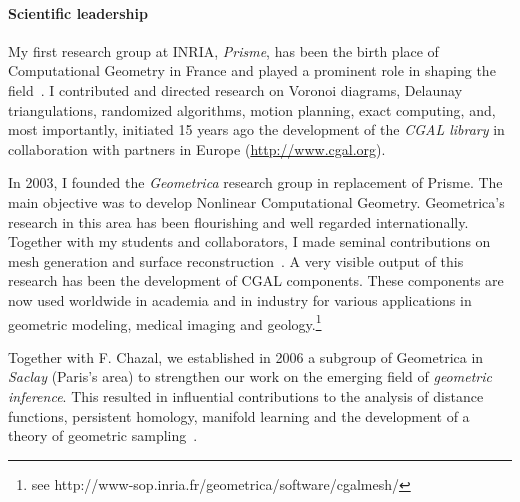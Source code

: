 
\paragraph{Scientific leadership} \mbox{}


My first research group at INRIA, {\em Prisme}, has been the birth place of Computational Geometry in France and played a prominent role in shaping the field~\cite{by-ag-98}. 
I contributed and directed research on Voronoi diagrams, Delaunay triangulations, randomized algorithms, motion planning, exact computing, and, most importantly, initiated 15 years ago the development of the {\em CGAL library} in collaboration with partners in Europe (\url{http://www.cgal.org}{}).

In 2003, I founded the {\em Geometrica} research group in replacement of Prisme. The main objective was to develop Nonlinear Computational Geometry. 
 Geometrica's research in this area has been flourishing and well regarded internationally. Together with my students and collaborators, I made seminal contributions on mesh generation and surface reconstruction~\cite{geometrica-ecg-book}. A very visible output of this research has been the development of CGAL components. These components are now used worldwide in academia and in industry for various applications in geometric modeling, medical imaging and geology.\footnote{see http://www-sop.inria.fr/geometrica/software/cgalmesh/}

Together with F. Chazal, we established in 2006 a subgroup of Geometrica in {\em Saclay} (Paris's area)  to strengthen our work on  the emerging field of {\em geometric inference}.  This resulted in influential contributions to the analysis of distance functions, persistent homology, manifold learning and the development of a theory of geometric sampling~\cite{geometrica-bgo-09,geometrica-ccl09}.
\newpage


